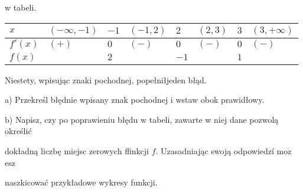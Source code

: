 \documentclass[a4paper,12pt]{article}
\begin{document}
w tabeli.
\begin{center}
\begin{tabular}{|l|l|l|l|l|l|l|l|}
\hline
\multicolumn{1}{|l|}{$x$}&	\multicolumn{1}{|l|}{ $(-\infty,-1)$}&	\multicolumn{1}{|l|}{ $-1$}&	\multicolumn{1}{|l|}{ $(-1,2)$}&	\multicolumn{1}{|l|}{ $2$}&	\multicolumn{1}{|l|}{ $(2,3)$}&	\multicolumn{1}{|l|}{ $3$}&	\multicolumn{1}{|l|}{ $(3,+\infty)$}	\\
\hline
\multicolumn{1}{|l|}{ $f'(x)$}&	\multicolumn{1}{|l|}{ $(+)$}&	\multicolumn{1}{|l|}{ $0$}&	\multicolumn{1}{|l|}{ $(-)$}&	\multicolumn{1}{|l|}{ $0$}&	\multicolumn{1}{|l|}{ $(-)$}&	\multicolumn{1}{|l|}{ $0$}&	\multicolumn{1}{|l|}{ $(-)$}	\\
\hline
\multicolumn{1}{|l|}{ $f(x)$}&	\multicolumn{1}{|l|}{}&	\multicolumn{1}{|l|}{ $2$}&	\multicolumn{1}{|l|}{}&	\multicolumn{1}{|l|}{ $-1$}&	\multicolumn{1}{|l|}{}&	\multicolumn{1}{|l|}{ $1$}&	\multicolumn{1}{|l|}{}	\\
\hline
\end{tabular}

\end{center}
Niestety, wpisując znaki pochodnej, popełniłjeden błąd.

a) Przekreśl błędnie wpisany znak pochodnej i wstaw obok prawidłowy.

b) Napisz, czy po poprawieniu błędu w tabeli, zawarte w niej dane pozwolą określić

dokładną liczbę miejsc zerowych ffinkcji $f$. Uzasadniając swoją odpowiedzí $\mathrm{m}\mathrm{o}\dot{\mathrm{z}}$ esz

naszkicować przykładowe wykresy funkcji.
\end{document}
